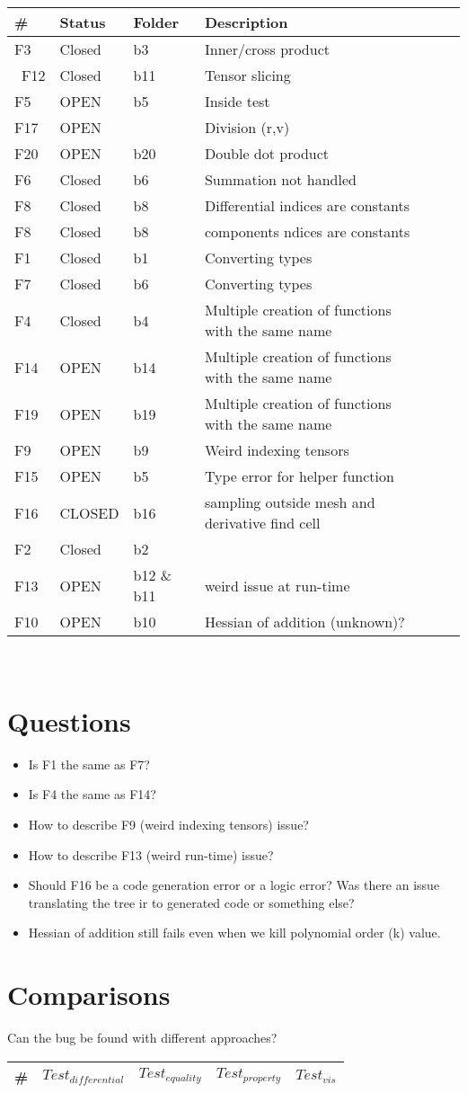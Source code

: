 \documentclass{article}
\newcommand{\testA}[0]{$\textit{Test}_{differential}$}
\newcommand{\testB}[0]{$\textit{Test}_{equality}$}
\newcommand{\testC}[0]{$\textit{Test}_{property}$}
\newcommand{\testD}[0]{$\textit{Test}_{vis}$}
\begin{document}
\begin{tabular}{|l|ll|lll|}
\hline
\# & Status & Folder & Description \\
\hline
 F3 &Closed&b3  & Inner/cross product  \\\
  F12 &Closed & b11 & Tensor slicing\\
   F5 &OPEN&b5& Inside test\\
F17 &OPEN &   & Division (r,v)\\
  F20 &OPEN & b20  & Double dot product\\
 F6 &Closed &b6  & Summation not handled \\
  F8 &Closed &b8 &Differential indices are constants\\
    F8 &Closed &b8 &components ndices are constants\\
 F1 &Closed& b1& Converting types\\
F7 &Closed& b6  & Converting types\\
 F4 &Closed&b4 &Multiple creation of functions with the same name \\
F14 &OPEN & b14 &Multiple creation of functions with the same name\\
F19 &OPEN & b19 &Multiple creation of functions with the same name\\
   F9 &OPEN&b9 & Weird indexing tensors\\
 F15 &OPEN&b5 & Type error for helper function\\
  F16 &CLOSED & b16  & sampling outside mesh and derivative find cell  \\
 F2 &Closed &b2  &\\
  F13 &OPEN & b12 \& b11  &weird issue at run-time\\
 F10 &OPEN &b10 &  Hessian of addition (unknown)?\\

\hline
\end{tabular}
\\


\section{Questions}
\begin{itemize}[noitemsep]
\item Is F1 the same as F7?
\item  Is F4 the same as F14?  
\item How to describe F9 (weird indexing tensors) issue?
\item How to describe F13 (weird run-time) issue?
\item Should F16 be a code generation error or a logic error? Was there an issue translating the tree ir to generated code or something else?
\item Hessian of addition still fails even when we kill polynomial order (k) value.
\end{itemize}



\section{Comparisons}
Can the bug be found with different approaches?\\
\begin{tabular}{|l|llll|}
\hline
\# & \testA{} & \testB{} & \testC{} & \testD{}\\
\hline
\end{tabular}




\end{document}
